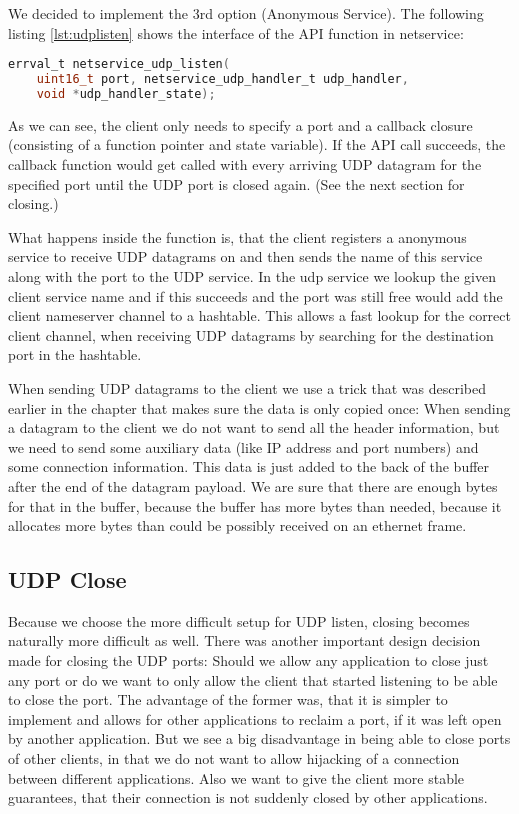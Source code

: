 We decided to implement the 3rd option (Anonymous Service).
The following listing \ref{lst:udplisten} shows the interface of the API function in netservice:

\begin{lstlisting}[language=c, caption=Interface for UDP listen, label=lst:udplisten]
errval_t netservice_udp_listen(
    uint16_t port, netservice_udp_handler_t udp_handler,
    void *udp_handler_state);
\end{lstlisting}

As we can see, the client only needs to specify a port and a callback closure (consisting of a function pointer and state variable). If the API call succeeds, the callback function would get called with every arriving UDP datagram for the specified port until the UDP port is closed again. (See the next section for closing.)

What happens inside the function is, that the client registers a anonymous service to receive UDP datagrams on and then sends the name of this service along with the port to the UDP service. In the udp service we lookup the given client service name and if this succeeds and the port was still free would add the client nameserver channel to a hashtable. This allows a fast lookup for the correct client channel, when receiving UDP datagrams by searching for the destination port in the hashtable.

When sending UDP datagrams to the client we use a trick that was described earlier in the chapter that makes sure the data is only copied once: When sending a datagram to the client we do not want to send all the header information, but we need to send some auxiliary data (like IP address and port numbers) and some connection information. This data is just added to the back of the buffer after the end of the datagram payload. We are sure that there are enough bytes for that in the buffer, because the buffer has more bytes than needed, because it allocates more bytes than could be possibly received on an ethernet frame.

\subsection{UDP Close}
Because we choose the more difficult setup for UDP listen, closing becomes naturally more difficult as well. There was another important design decision made for closing the UDP ports: Should we allow any application to close just any port or do we want to only allow the client that started listening to be able to close the port. The advantage of the former was, that it is simpler to implement and allows for other applications to reclaim a port, if it was left open by another application. But we see a big disadvantage in being able to close ports of other clients, in that we do not want to allow hijacking of a connection between different applications. Also we want to give the client more stable guarantees, that their connection is not suddenly closed by other applications.

